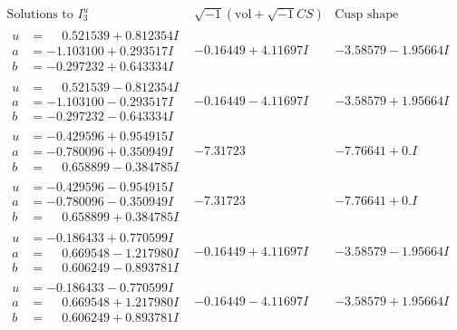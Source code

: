 \documentclass[1p]{elsarticle_modified}
\theoremstyle{definition}
\newcommand{\I}{\sqrt{-1}}
\begin{document}
$$\begin{array}{c|c|c}  
\text{Solutions to }I^u_{3}& \I (\text{vol} + \sqrt{-1}CS) & \text{Cusp shape}\\
 \hline 
\begin{aligned}
u &= \phantom{-}0.521539 + 0.812354 I \\
a &= -1.103100 + 0.293517 I \\
b &= -0.297232 + 0.643334 I\end{aligned}
 & -0.16449 + 4.11697 I & -3.58579 - 1.95664 I \\ \hline\begin{aligned}
u &= \phantom{-}0.521539 - 0.812354 I \\
a &= -1.103100 - 0.293517 I \\
b &= -0.297232 - 0.643334 I\end{aligned}
 & -0.16449 - 4.11697 I & -3.58579 + 1.95664 I \\ \hline\begin{aligned}
u &= -0.429596 + 0.954915 I \\
a &= -0.780096 + 0.350949 I \\
b &= \phantom{-}0.658899 - 0.384785 I\end{aligned}
 & -7.31723\phantom{ +0.000000I} & -7.76641 + 0. I\phantom{ +0.000000I} \\ \hline\begin{aligned}
u &= -0.429596 - 0.954915 I \\
a &= -0.780096 - 0.350949 I \\
b &= \phantom{-}0.658899 + 0.384785 I\end{aligned}
 & -7.31723\phantom{ +0.000000I} & -7.76641 + 0. I\phantom{ +0.000000I} \\ \hline\begin{aligned}
u &= -0.186433 + 0.770599 I \\
a &= \phantom{-}0.669548 - 1.217980 I \\
b &= \phantom{-}0.606249 - 0.893781 I\end{aligned}
 & -0.16449 + 4.11697 I & -3.58579 - 1.95664 I \\ \hline\begin{aligned}
u &= -0.186433 - 0.770599 I \\
a &= \phantom{-}0.669548 + 1.217980 I \\
b &= \phantom{-}0.606249 + 0.893781 I\end{aligned}
 & -0.16449 - 4.11697 I & -3.58579 + 1.95664 I \\ \hline\begin{aligned}

\end{aligned}
\end{array}$$
\end{document}
